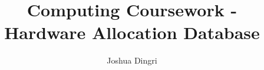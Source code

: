 \documentclass{report}
\begin{document}
\title{Computing Coursework - Hardware Allocation Database}
\author{Joshua Dingri}
\maketitle
\tableofcontents






\end{document}
